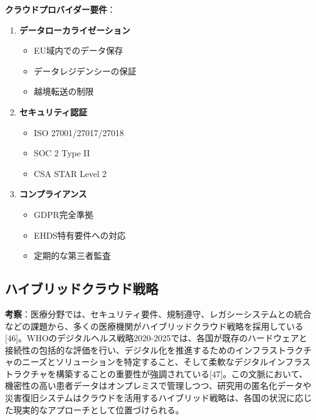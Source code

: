 \documentclass[
  a4paper,
  a4paper,
  11pt]{ltjsbook}
\providecommand{\tightlist}{%
  \setlength{\itemsep}{0pt}\setlength{\parskip}{0pt}}
\begin{document}
\textbf{クラウドプロバイダー要件}：

\begin{enumerate}
\def\labelenumi{\arabic{enumi}.}
\tightlist
\item
  \textbf{データローカライゼーション}

  \begin{itemize}
  \tightlist
  \item
    EU域内でのデータ保存
  \item
    データレジデンシーの保証
  \item
    越境転送の制限
  \end{itemize}
\item
  \textbf{セキュリティ認証}

  \begin{itemize}
  \tightlist
  \item
    ISO 27001/27017/27018
  \item
    SOC 2 Type II
  \item
    CSA STAR Level 2
  \end{itemize}
\item
  \textbf{コンプライアンス}

  \begin{itemize}
  \tightlist
  \item
    GDPR完全準拠
  \item
    EHDS特有要件への対応
  \item
    定期的な第三者監査
  \end{itemize}
\end{enumerate}

\subsection{ハイブリッドクラウド戦略}\label{ux30cfux30a4ux30d6ux30eaux30c3ux30c9ux30afux30e9ux30a6ux30c9ux6226ux7565}

\textbf{考察}：医療分野では、セキュリティ要件、規制遵守、レガシーシステムとの統合などの課題から、多くの医療機関がハイブリッドクラウド戦略を採用している{[}46{]}。WHOのデジタルヘルス戦略2020-2025では、各国が既存のハードウェアと接続性の包括的な評価を行い、デジタル化を推進するためのインフラストラクチャのニーズとソリューションを特定すること、そして柔軟なデジタルインフラストラクチャを構築することの重要性が強調されている{[}47{]}。この文脈において、機密性の高い患者データはオンプレミスで管理しつつ、研究用の匿名化データや災害復旧システムはクラウドを活用するハイブリッド戦略は、各国の状況に応じた現実的なアプローチとして位置づけられる。
\end{document}
